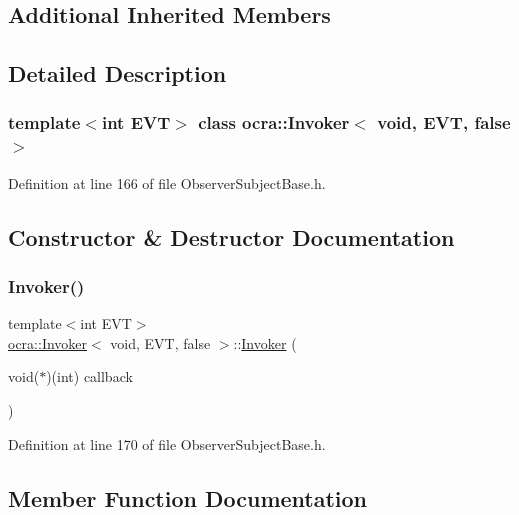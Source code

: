 \subsection*{Additional Inherited Members}


\subsection{Detailed Description}
\subsubsection*{template$<$int E\+VT$>$\newline
class ocra\+::\+Invoker$<$ void, E\+V\+T, false $>$}



Definition at line 166 of file Observer\+Subject\+Base.\+h.



\subsection{Constructor \& Destructor Documentation}
\hypertarget{classocra_1_1Invoker_3_01void_00_01EVT_00_01false_01_4_adbb4357c33d4e320a3a21916fd76fd80}{}\label{classocra_1_1Invoker_3_01void_00_01EVT_00_01false_01_4_adbb4357c33d4e320a3a21916fd76fd80} 
\subsubsection{\texorpdfstring{Invoker()}{Invoker()}}
{\footnotesize\ttfamily template$<$int E\+VT$>$ \\
\hyperlink{classocra_1_1Invoker}{ocra\+::\+Invoker}$<$ void, E\+VT, false $>$\+::\hyperlink{classocra_1_1Invoker}{Invoker} (\begin{DoxyParamCaption}\item[{void($\ast$)(int)}]{callback }\end{DoxyParamCaption})\hspace{0.3cm}{\ttfamily [inline]}}



Definition at line 170 of file Observer\+Subject\+Base.\+h.



\subsection{Member Function Documentation}
\hypertarget{classocra_1_1Invoker_3_01void_00_01EVT_00_01false_01_4_a28f6e1841ccdb09d1bfefbb529d51f79}{}\label{classocra_1_1Invoker_3_01void_00_01EVT_00_01false_01_4_a28f6e1841ccdb09d1bfefbb529d51f79} 
